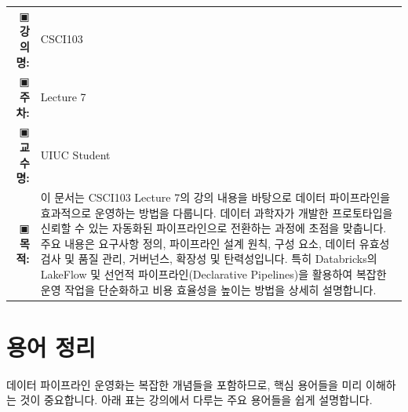 \documentclass[11pt,a4paper]{article}
\makeatletter
\theoremstyle{definition}
\newcommand{\metainfo}[4]{
\begin{tcolorbox}[
    colback=lightpurple,
    colframe=darkpurple,
    boxrule=1pt,
    arc=2mm,
    left=10pt,
    right=10pt,
    top=8pt,
    bottom=8pt
]
\begin{tabular}{@{}rl@{}}
▣ \textbf{강의명:} & #1 \\[0.3em]
▣ \textbf{주차:} & #2 \\[0.3em]
▣ \textbf{교수명:} & #3 \\[0.3em]
▣ \textbf{목적:} & \begin{minipage}[t]{0.75\textwidth}#4\end{minipage}
\end{tabular}
\end{tcolorbox}
}
\makeatother
\begin{document}
\thispagestyle{firstpage}

\metainfo{CSCI103}{Lecture 7}{UIUC Student}{이 문서는 CSCI103 Lecture 7의 강의 내용을 바탕으로 데이터 파이프라인을 효과적으로 운영하는 방법을 다룹니다. 데이터 과학자가 개발한 프로토타입을 신뢰할 수 있는 자동화된 파이프라인으로 전환하는 과정에 초점을 맞춥니다. 주요 내용은 요구사항 정의, 파이프라인 설계 원칙, 구성 요소, 데이터 유효성 검사 및 품질 관리, 거버넌스, 확장성 및 탄력성입니다. 특히 Databricks의 LakeFlow 및 선언적 파이프라인(Declarative Pipelines)을 활용하여 복잡한 운영 작업을 단순화하고 비용 효율성을 높이는 방법을 상세히 설명합니다.}

\tableofcontents

\newpage

\section{용어 정리}

데이터 파이프라인 운영화는 복잡한 개념들을 포함하므로, 핵심 용어들을 미리 이해하는 것이 중요합니다. 아래 표는 강의에서 다루는 주요 용어들을 쉽게 설명합니다.
\end{document}
